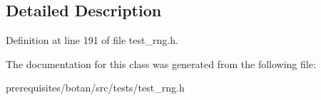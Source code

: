 \subsection{Detailed Description}


Definition at line 191 of file test\+\_\+rng.\+h.



The documentation for this class was generated from the following file\+:\begin{DoxyCompactItemize}
\item 
prerequisites/botan/src/tests/test\+\_\+rng.\+h\end{DoxyCompactItemize}
